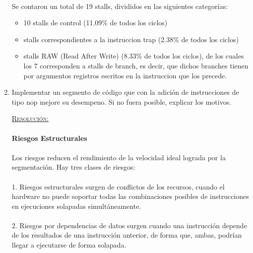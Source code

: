 \documentclass[a4paper,11pt]{article}
\begin{document}
\begin{enumerate}
\paragraph{} 

Se contaron un total de 19 stalls, divididos en las siguientes categor\'ias:

\begin{itemize}
 \item 10 stalls de control (11.09\% de todos los ciclos)
 \item  stalls correspondientes a la instruccion trap (2.38\% de todos los ciclos)
 \item stalls RAW (Read After Write) (8.33\% de todos los ciclos), de los cuales los 7 corresponden a stalls de branch, es decir, que dichos branches tienen por argumentos registros escritos en la instruccion que los precede.
\end{itemize}

\newpage

\item Implementar un segmento de c\'odigo que con la adici\'on de instrucciones de tipo nop mejore su desempeno. Si no fuera posible, explicar los motivos.

\underline{\textsc{Resoluci\'on:}}

\paragraph{Riesgos Estructurales}

\paragraph{}
Los riesgos reducen el rendimiento de la velocidad ideal lograda por la segmentaci\'on. Hay tres clases de riesgos:
\paragraph{}
1. Riesgos estructurales surgen de conflictos de los recursos, cuando el hardware no puede soportar todas las combinaciones posibles de instrucciones en ejecuciones solapadas simult\'aneamente.
\paragraph{}
2. Riesgos por dependencias de datos surgen cuando una instrucci\'on depende de los resultados de una instrucci\'on anterior, de forma que, ambas, podr\'ian llegar a ejecutarse de forma solapada.

\end{enumerate}
\end{document}
